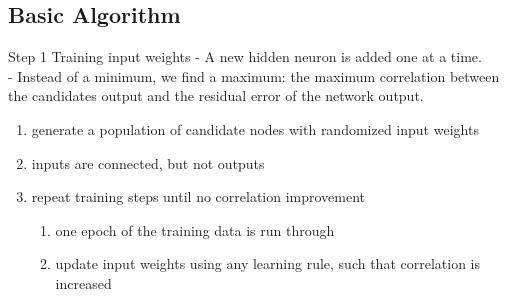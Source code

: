 \documentclass[presentation]{beamer}
\begin{document}
\subsection{Basic Algorithm}
\label{sec:org9411f56}
\begin{frame}[label={sec:org2b7dbb6}]{Step 1 Training input weights}
  - A new hidden neuron is added one at a time. \\
  - Instead of a minimum, we find a maximum: the maximum correlation between the candidates output and the residual error of the network output.

  \begin{enumerate}
  \item generate a population of candidate nodes with randomized input weights
  \item inputs are connected, but not outputs
  \item repeat training steps until no correlation improvement
  \begin{enumerate}
  \item one epoch of the training data is run through
  \item update input weights using any learning rule, such that correlation is increased
  \end{enumerate}
  \end{enumerate}
\end{frame}
\end{document}
